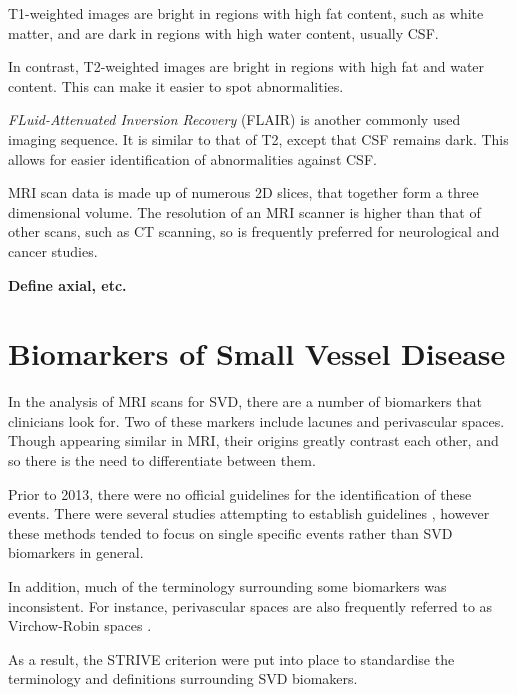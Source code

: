 T1-weighted images are bright in regions with high fat content, such as white matter, and are dark in regions with high water content, usually CSF.

In contrast, T2-weighted images are bright in regions with high fat and water content. This can make it easier to spot abnormalities.

\textit{FLuid-Attenuated Inversion Recovery} (FLAIR) is another commonly used imaging sequence. It is similar to that of T2, except that CSF remains dark. This allows for easier identification of abnormalities against CSF.


MRI scan data is made up of numerous 2D slices, that together form a three dimensional volume. The resolution of an MRI scanner is higher than that of other scans, such as CT scanning, so is frequently preferred for neurological and cancer studies.

\textbf{Define axial, etc.}

\section{Biomarkers of Small Vessel Disease}\label{svd-markers}

In the analysis of MRI scans for SVD, there are a number of biomarkers that clinicians look for. Two of these markers include lacunes and perivascular spaces. Though appearing similar in MRI, their origins greatly contrast each other, and so there is the need to differentiate between them.

Prior to 2013, there were no official guidelines for the identification of these events. There were several studies attempting to establish guidelines \cite{PotterGillian2015CPSV, AdamsH.H.Hieab2013RMfD}, however these methods tended to focus on single specific events rather than SVD biomarkers in general.

In addition, much of the terminology surrounding some biomarkers was inconsistent. For instance, perivascular spaces are also frequently referred to as Virchow-Robin spaces \cite{AdamsH.H.Hieab2013RMfD, WardlawJ.M.2013Nsfr}.

As a result, the STRIVE criterion \cite{WardlawJ.M.2013Nsfr} were put into place to standardise the terminology and definitions surrounding SVD biomakers.

